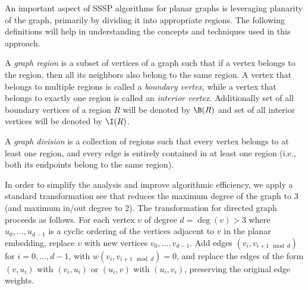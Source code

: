 An important aspect of SSSP algorithms for planar graphs is leveraging planarity of the graph, primarily by dividing it into appropriate regions. The following definitions will help in understanding the concepts and techniques used in this approach.

\begin{defn}
A \emph{graph region} is a subset of vertices of a graph such that if a vertex belongs to the region, then all its neighbors also belong to the same region. A vertex that belongs to multiple regions is called a \emph{boundary vertex}, while a vertex that belongs to exactly one region is called an \emph{interior vertex}. Additionally set of all boundary vertices of a region $R$ will be denoted by $\B(R)$ and set of all interior vertices will be denoted by $\I(R)$.
\end{defn}

\begin{defn}
A \emph{graph division} is a collection of regions such that every vertex belongs to at least one region, and every edge is entirely contained in at least one region (i.e., both its endpoints belong to the same region).
\end{defn}

In order to simplify the analysis and improve algorithmic efficiency, we apply a standard transformation see  that reduces the maximum degree of the graph to 3 (and maximum in/out degree to 2). The transformation for directed graph proceeds as follows. For each vertex $v$ of degree $d =  \deg(v) > 3$ where $u_0, ..., u_{d-1}$ is a cyclic ordering of the vertices adjacent to $v$ in the planar embedding, replace $v$ with new vertices $v_0, ..., v_{d-1}$. Add edges $(v_i,v_{i+1 \mod d})$ for $ i=0,...,d-1$,
with $w(v_i, v_{i+1 \mod d}) = 0$, and replace the edges of the form $(v, u_i)$ with $(v_i,u_i)$ or $(u_i, v)$ with $(u_i, v_i)$, preserving the original edge weights. \cite{frederickson}

